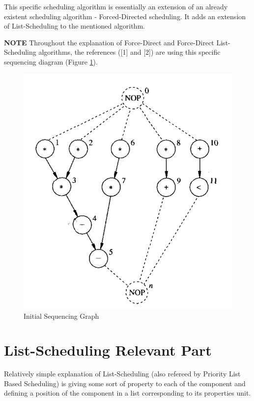 \documentclass[conference]{IEEEtran}
\begin{document}
This specific scheduling algorithm is essentially an extension of an already existent scheduling algorithm - Forced-Directed scheduling. It adds an extension of List-Scheduling to the mentioned algorithm.

\textbf{NOTE}
Throughout the explanation of Force-Direct and Force-Direct List-Scheduling algorithms, the references ([1] and [2]) are using this specific sequencing diagram (Figure \ref{sequence}).

\begin{figure}[htbp]
\centerline{\includegraphics[scale=.5]{Sequencing_Graph.png}}
\caption{Initial Sequencing Graph}
\label{sequence}
\end{figure}

\section{List-Scheduling Relevant Part}

Relatively simple explanation of List-Scheduling (also refereed by Priority List Based Scheduling) is giving some sort of property to each of the component and defining a position of the component in a list corresponding to its properties unit.
\end{document}
